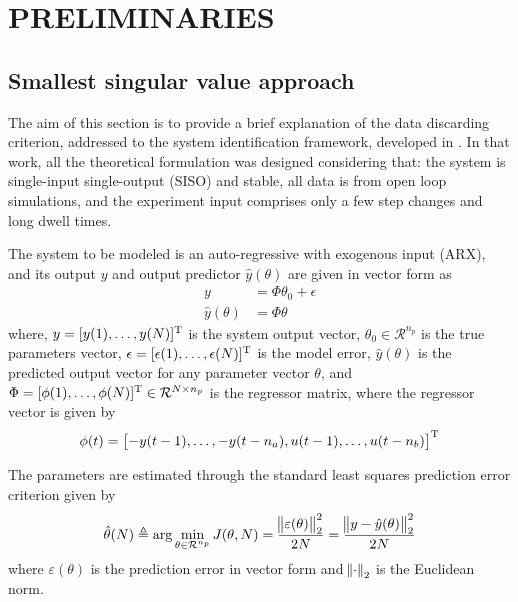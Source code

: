 

\section{\label{sec:preliminaries} PRELIMINARIES}

\subsection{\label{subsec:ssv} Smallest singular value approach}

The aim of this section is to provide a brief explanation of the data discarding criterion, addressed to the system identification framework, developed in \cite{carrette1996discarding}.
In that work, all the theoretical formulation was designed considering that: the system is single-input single-output (SISO) and stable, all data is from open loop simulations, and the experiment input comprises only a few step changes and long dwell times.

The system to be modeled is an auto-regressive with exogenous input (ARX), and its output $y$ and output predictor $\hat{y}(\theta)$ are given in vector form as
\begin{align}
	y &= \Phi\theta_0 + \epsilon \label{eq:system_vec}\\
	\hat{y}(\theta) &= \Phi\theta \label{eq:predic_output_vec}
\end{align}
where, $y = [y(1), \dots, y(N)]^\text{T}$ is the system output vector,  $\theta_0 \in \mathcal{R}^{n_p}$ is the true parameters vector, $\epsilon = [\epsilon(1), \dots, \epsilon(N)]^\text{T}$ is the model error, $\hat{y}(\theta)$ is the predicted output vector for any parameter vector $\theta$, and $\Phi = [\phi(1), \dots, \phi(N)]^\text{T} \in \mathcal{R}^{N \times n_p}$ is the regressor matrix, where the regressor vector is given by
\begin{align*}
	\phi(t) = \left[ -y(t-1), \dots, -y(t-n_a), u(t-1), \dots, u(t-n_b) \right] ^\text{T}
\end{align*}

The parameters are estimated through the standard least squares prediction error criterion given by
\[
	\hat{\theta}(N) \triangleq \arg \min_{\theta \in \mathcal{R}^{n_p}} J(\theta, N) = \frac{\norm{\varepsilon(\theta)}_2^2}{2N} = \frac{\norm{y-\hat{y}(\theta)}_2^2}{2N}
\]
where $\varepsilon(\theta)$ is the prediction error in vector form and $\norm{\cdot}_2$ is the Euclidean norm.

